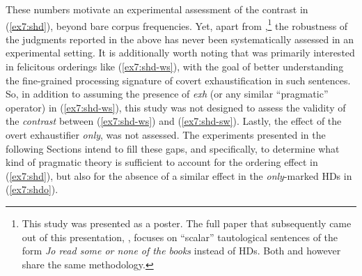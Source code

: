 These numbers motivate an experimental assessment of the contrast in (\ref{ex7:shd}), beyond bare corpus frequencies. Yet, apart from \textcite{Chemla2013},\footnote{This study was presented as a poster. The full paper that subsequently came out of this presentation, \textcite{Chemla2016}, focuses on ``scalar'' tautological sentences of the form \textit{Jo read some or none of the books} instead of HDs. Both \textcite{Chemla2013} and \textcite{Chemla2016} however share the same methodology.} the robustness of the judgments reported in the above has never been systematically assessed in an experimental setting. It is additionally worth noting that \textcite{Chemla2013} was primarily interested in felicitous orderings like (\ref{ex7:shd-ws}), with the goal of better understanding the fine-grained processing signature of covert exhaustification in such sentences. So, in addition to assuming the presence of \textit{exh} (or any similar ``pragmatic'' operator) in (\ref{ex7:shd-ws}), this study was not designed to assess the validity of the \textit{contrast} between (\ref{ex7:shd-ws}) and (\ref{ex7:shd-sw}). Lastly, the effect of the overt exhaustifier \textit{only}, was not assessed.  The experiments presented in the following Sections intend to fill these gaps, and specifically, to determine what kind of pragmatic theory is sufficient to account for the ordering effect in (\ref{ex7:shd}), but also for the absence of a similar effect in the \textit{only}-marked HDs in (\ref{ex7:shdo}).\\

